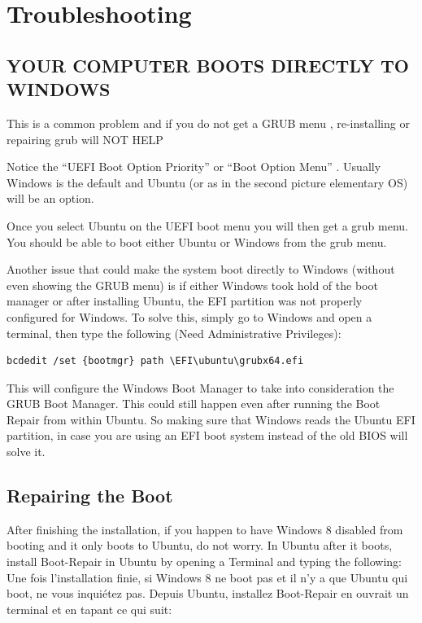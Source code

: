 \documentclass[fr]{../guide}
\begin{document}
\section{Troubleshooting}

\subsection{YOUR COMPUTER BOOTS DIRECTLY TO WINDOWS}

This is a common problem and if you do not get a GRUB menu , re-installing or repairing grub will NOT HELP

Notice the ``UEFI Boot Option Priority'' or ``Boot Option Menu'' . Usually Windows is the default and Ubuntu (or as in the second picture elementary OS) will be an option.

Once you select Ubuntu on the UEFI boot menu you will then get a grub menu. You should be able to boot either Ubuntu or Windows from the grub menu.

Another issue that could make the system boot directly to Windows (without even showing the GRUB menu) is if either Windows took hold of the boot manager or after installing Ubuntu, the EFI partition was not properly configured for Windows. To solve this, simply go to Windows and open a terminal, then type the following (Need Administrative Privileges):
\begin{verbatim}
bcdedit /set {bootmgr} path \EFI\ubuntu\grubx64.efi
\end{verbatim}
This will configure the Windows Boot Manager to take into consideration the GRUB Boot Manager. This could still happen even after running the Boot Repair from within Ubuntu. So making sure that Windows reads the Ubuntu EFI partition, in case you are using an EFI boot system instead of the old BIOS will solve it.

\subsection{Repairing the Boot}
{After finishing the installation, if you happen to have Windows 8 disabled from booting and it only boots to Ubuntu, do not worry. In Ubuntu after it boots, install Boot-Repair in Ubuntu by opening a Terminal and typing the following:}
{Une fois l'installation finie, si Windows 8 ne boot pas et il n'y a que Ubuntu qui boot, ne vous inquiétez pas.
Depuis Ubuntu, installez Boot-Repair en ouvrait un terminal et en tapant ce qui suit:}
\end{document}

